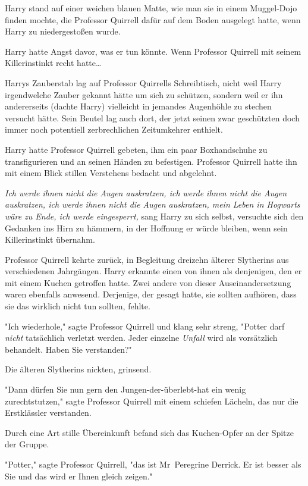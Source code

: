 {Harry stand auf einer weichen blauen Matte, wie man sie in einem Muggel-Dojo finden mochte, die Professor Quirrell dafür auf dem Boden ausgelegt hatte, wenn Harry zu niedergestoßen wurde.

Harry hatte Angst davor, was er tun könnte. Wenn Professor Quirrell mit seinem Killerinstinkt recht hatte…

Harrys Zauberstab lag auf Professor Quirrells Schreibtisch, nicht weil Harry irgendwelche Zauber gekannt hätte um sich zu schützen, sondern weil er ihn andererseits (dachte Harry) vielleicht in jemandes Augenhöhle zu stechen versucht hätte. Sein Beutel lag auch dort, der jetzt seinen zwar geschützten doch immer noch potentiell zerbrechlichen Zeitumkehrer enthielt.

Harry hatte Professor Quirrell gebeten, ihm ein paar Boxhandschuhe zu transfigurieren und an seinen Händen zu befestigen. Professor Quirrell hatte ihn mit einem Blick stillen Verstehens bedacht und abgelehnt.

\emph{Ich werde ihnen nicht die Augen auskratzen, ich werde ihnen nicht die Augen auskratzen, ich werde ihnen nicht die Augen auskratzen, mein Leben in Hogwarts wäre zu Ende, ich werde eingesperrt,} sang Harry zu sich selbst, versuchte sich den Gedanken ins Hirn zu hämmern, in der Hoffnung er würde bleiben, wenn sein Killerinstinkt übernahm.

Professor Quirrell kehrte zurück, in Begleitung dreizehn älterer Slytherins aus verschiedenen Jahrgängen. Harry erkannte einen von ihnen als denjenigen, den er mit einem Kuchen getroffen hatte. Zwei andere von dieser Auseinandersetzung waren ebenfalls anwesend. Derjenige, der gesagt hatte, sie sollten aufhören, dass sie das wirklich nicht tun sollten, fehlte.

"Ich wiederhole," sagte Professor Quirrell und klang sehr streng, "Potter darf \emph{nicht} tatsächlich verletzt werden. Jeder einzelne \emph{Unfall} wird als vorsätzlich behandelt. Haben Sie verstanden?"

Die älteren Slytherins nickten, grinsend.

"Dann dürfen Sie nun gern den Jungen-der-überlebt-hat ein wenig zurechtstutzen," sagte Professor Quirrell mit einem schiefen Lächeln, das nur die Erstklässler verstanden.

Durch eine Art stille Übereinkunft befand sich das Kuchen-Opfer an der Spitze der Gruppe.

"Potter," sagte Professor Quirrell, "das ist Mr~Peregrine Derrick. Er ist besser als Sie und das wird er Ihnen gleich zeigen."

}
